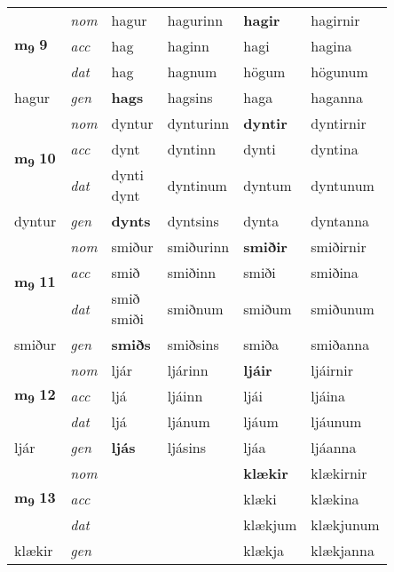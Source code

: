 \begin{longtable}[l]{X>{\footnotesize\itshape}XXXXX}
\multirow{3}{*}{{{\textbf{m{\textsubscript{9}}} \Large{\textbf{9}}}}} & nom & hagur & hagurinn & \textbf{hagir} & hagirnir \\*
 & acc & hag & haginn & hagi & hagina \\*
 & dat & hag & hagnum & högum & högunum \\*
 {\footnotesize{hagur}} & gen & \textbf{hags} & hagsins & haga & haganna \\
\cmidrule{1-6}

\multirow{3}{*}{{{\textbf{m{\textsubscript{9}}} \Large{\textbf{10}}}}} & nom & dyntur & dynturinn & \textbf{dyntir} & dyntirnir \\*
 & acc & dynt & dyntinn & dynti & dyntina \\*
 & dat & \specialcell{dynti\\ dynt} & dyntinum & dyntum & dyntunum \\*
 {\footnotesize{dyntur}} & gen & \textbf{dynts} & dyntsins & dynta & dyntanna \\
\cmidrule{1-6}

\multirow{3}{*}{{{\textbf{m{\textsubscript{9}}} \Large{\textbf{11}}}}} & nom & smiður & smiðurinn & \textbf{smiðir} & smiðirnir \\*
 & acc & smið & smiðinn & smiði & smiðina \\*
 & dat & \specialcell{smið\\ smiði} & smiðnum & smiðum & smiðunum \\*
 {\footnotesize{smiður}} & gen & \textbf{smiðs} & smiðsins & smiða & smiðanna \\
\cmidrule{1-6}

\multirow{3}{*}{{{\textbf{m{\textsubscript{9}}} \Large{\textbf{12}}}}} & nom & ljár & ljárinn & \textbf{ljáir} & ljáirnir \\*
 & acc & ljá & ljáinn & ljái & ljáina \\*
 & dat & ljá & ljánum & ljáum & ljáunum \\*
 {\footnotesize{ljár}} & gen & \textbf{ljás} & ljásins & ljáa & ljáanna \\
\cmidrule{1-6}

\multirow{3}{*}{{{\textbf{m{\textsubscript{9}}} \Large{\textbf{13}}}}} & nom &  &  & \textbf{klækir} & klækirnir \\*
 & acc &  &  & klæki & klækina \\*
 & dat &  &  & klækjum & klækjunum \\*
 {\footnotesize{klækir}} & gen & \textbf{} &  & klækja & klækjanna \\
\cmidrule{1-6}


\end{longtable}
